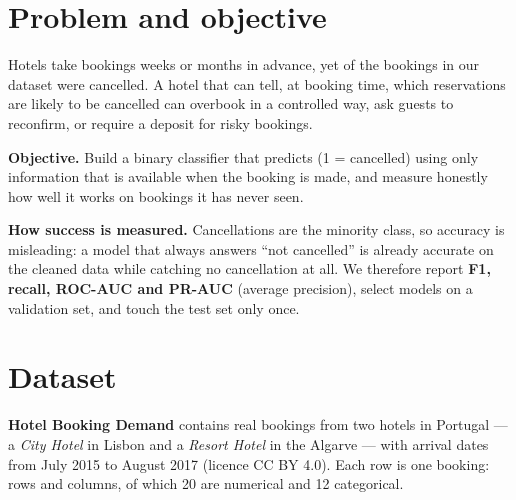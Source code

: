 
\section{Problem and objective}\label{tb:problem}
Hotels take bookings weeks or months in advance, yet \TBCancelRaw{} of the bookings in our dataset were cancelled.
A hotel that can tell, at booking time, which reservations are likely to be cancelled can overbook in a controlled way,
ask guests to reconfirm, or require a deposit for risky bookings.

\textbf{Objective.} Build a binary classifier that predicts  (1 = cancelled) using only information
that is available when the booking is made, and measure honestly how well it works on bookings it has never seen.

\textbf{How success is measured.} Cancellations are the minority class, so accuracy is misleading: a model that always
answers ``not cancelled'' is already \TBNotCancelClean{} accurate on the cleaned data while catching no cancellation at all.
We therefore report \textbf{F1, recall, ROC-AUC and PR-AUC} (average precision), select models on a validation set, and
touch the test set only once.

\section{Dataset}\label{tb:dataset}
\textbf{Hotel Booking Demand} \cite{tb-antonio} contains real bookings from two hotels in Portugal — a \emph{City Hotel} in
Lisbon and a \emph{Resort Hotel} in the Algarve — with arrival dates from July 2015 to August 2017 (licence CC BY 4.0).
Each row is one booking: \TBRowsRaw{} rows and \TBColsRaw{} columns, of which 20 are numerical and 12 categorical.

